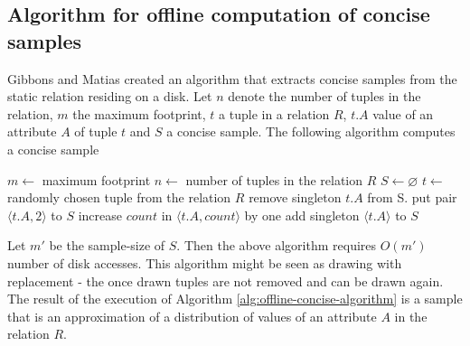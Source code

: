 \subsection{Algorithm for offline computation of concise samples }
Gibbons and Matias \cite{GM98} created an algorithm that extracts
concise samples from the static relation residing on a disk.
Let $n$ denote the number of tuples in the relation, $m$ the
maximum footprint, $t$ a tuple in a relation $R$, $t.A$ value of an attribute $A$
of tuple $t$ and $S$ a concise sample. The following algorithm
computes a concise sample

\begin{center}
    \label{alg:offline-concise-algorithm}
\begin{algorithmic}
  \State $m \gets$ maximum footprint
  \State $n \gets$ number of tuples in the relation $R$
  \State $S \gets  \varnothing$
    \State $t \gets$ randomly chosen tuple from the relation $R$
        \State remove singleton $t.A$ from S.
        \State put pair $\langle t.A, 2 \rangle$ to $S$
        \State increase $count$ in $\langle t.A, count
        \rangle $ by one
    \Else
        \State add singleton $\langle t.A \rangle$ to $S$
    \EndIf
    \EndWhile
  \end{algorithmic}
\end{center}

Let $m'$ be the sample-size of $S$. Then the above algorithm requires
$O(m')$ number of disk accesses. This algorithm might be seen
as drawing with replacement - the once drawn tuples are not removed
and can be drawn again. The result of the execution of Algorithm
\ref{alg:offline-concise-algorithm} is a sample that is an
approximation of a distribution of values of an attribute $A$ in the relation $R$.

